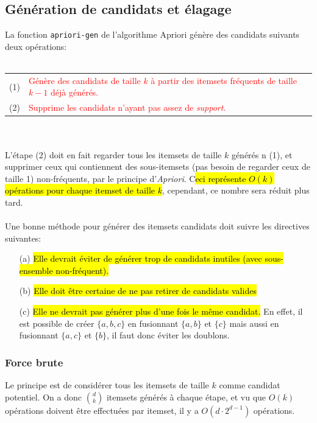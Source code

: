 \documentclass[letterpaper, 12pt]{article}
\newcommand{\alinea}{
\hspace*{0.5cm}}
\newcommand{\red}[1]{
	\textcolor{red}{#1}}
\newcommand{\myul}[1]{
		\underline{\smash{#1}}
	}
\begin{document}
		\subsection{Génération de candidats et élagage}\label{sec:apriori:gen}
			\alinea La fonction \texttt{apriori-gen} de l'algorithme Apriori
				génère des candidats suivants deux opérations:\\~\\
				\begin{tabular}{lp{12cm}}
					(1) \myul{\textbf{\hl{Génération de candidat}}} & 
						\red{Génère des candidats de taille $k$ à partir 
							des itemsets fréquents de taille $k-1$ déjà générés.}\\
					(2) \myul{\textbf{\hl{\'Elagage des candidats}}} & 
						\red{Supprime les candidats n'ayant pas assez de
						\textit{support}.}
				\end{tabular}~\\~\\
			\alinea L'étape (2) doit en fait regarder tous les itemsets de
				taille $k$ générés n (1), et supprimer ceux qui contiennent
				des sous-itemsets (pas besoin de regarder ceux de taille 1)
				non-fréquents, par le principe d'\textit{Apriori}. C\hl{eci
				représente $O(k)$ opérations pour chaque itemset de
				taille $k$}, cependant, ce nombre sera réduit plus tard.\\
			~\\
			\alinea Une bonne méthode pour générer des itemsets candidats doit
				suivre les directives suivantes:
				\begin{enumerate}
					\setlength{\itemsep}{0pt}
					\setlength{\parskip}{0pt}
					\setlength{\parsep}{0pt}
					\item[(a)] \hl{Elle devrait éviter de générer trop de 
						candidats inutiles (avec sous-ensemble non-fréquent).}
					\item[(b)] \hl{Elle doit être certaine de ne pas retirer
						de candidats valides}
					\item[(c)] \hl{Elle ne devrait pas générer plus d'une fois
						le même candidat.} En effet, il est possible de
						créer $\{a,b,c\}$ en fusionnant $\{a, b\}$ et $\{c\}$
						mais aussi en fusionnant $\{a, c\}$ et $\{b\}$, il
						faut donc éviter les doublons.
				\end{enumerate}
			\subsubsection{Force brute}
				\alinea Le principe est de considérer tous les itemsets
					de taille $k$ comme candidat potentiel. On a donc
					$\binom{d}{k}$ itemsets générés à chaque étape,
					et vu que $O(k)$ opérations doivent être effectuées par
					itemset, il y a $O(d\cdot 2^{d-1})$ opérations.
\end{document}
